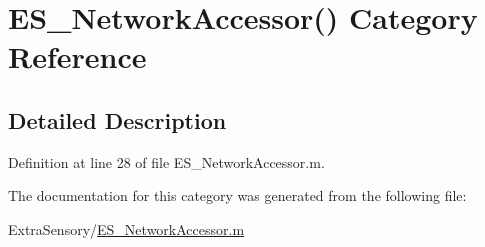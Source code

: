 \hypertarget{category_e_s___network_accessor_07_08}{\section{E\+S\+\_\+\+Network\+Accessor() Category Reference}
\label{category_e_s___network_accessor_07_08}
}


\subsection{Detailed Description}


Definition at line 28 of file E\+S\+\_\+\+Network\+Accessor.\+m.



The documentation for this category was generated from the following file\+:\begin{DoxyCompactItemize}
\item 
Extra\+Sensory/\hyperlink{_e_s___network_accessor_8m}{E\+S\+\_\+\+Network\+Accessor.\+m}\end{DoxyCompactItemize}
